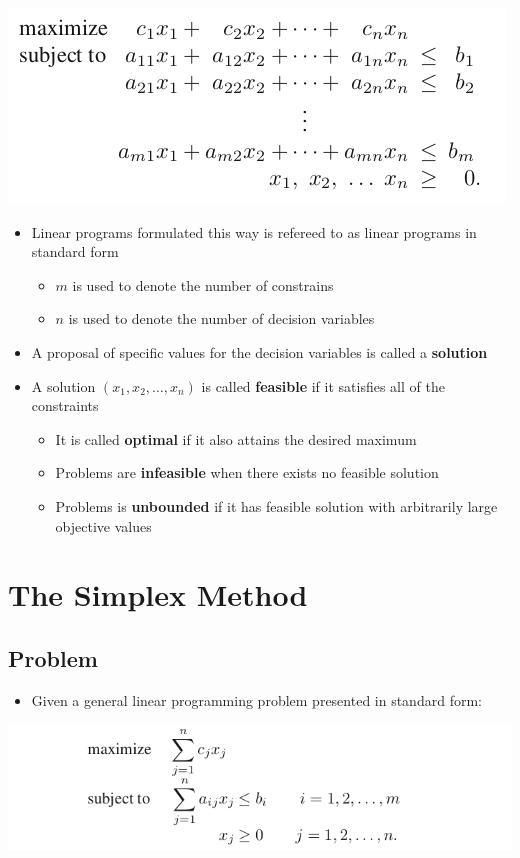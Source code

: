 \documentclass[11pt]{article}
\begin{document}
\begin{center}
\includegraphics[width=.9\linewidth]{Introduction (1)/screenshot_2019-01-28_08-20-31.png}
\end{center}
\begin{itemize}
\item Linear programs formulated this way is refereed to as linear programs in standard form
\begin{itemize}
\item \(m\) is used to denote the number of constrains
\item \(n\) is used to denote the number of decision variables
\end{itemize}

\item A proposal of specific values for the decision variables is called a \textbf{solution}
\item A solution \((x_1, x_2, \dots, x_n)\) is called \textbf{feasible} if it satisfies all of the constraints
\begin{itemize}
\item It is called \textbf{optimal} if it also attains the desired maximum
\item Problems are \textbf{infeasible} when there exists no feasible solution
\item Problems is \textbf{unbounded} if it has feasible solution with arbitrarily large objective values
\end{itemize}
\end{itemize}

\section{The Simplex Method}
\label{sec:org5812b7f}
\subsection{Problem}
\label{sec:org7311ee7}
\begin{itemize}
\item Given a general linear programming problem presented in standard form:
\end{itemize}
\begin{center}
\includegraphics[width=.9\linewidth]{The Simplex Method/screenshot_2019-01-28_08-52-51.png}
\end{center}
\end{document}
